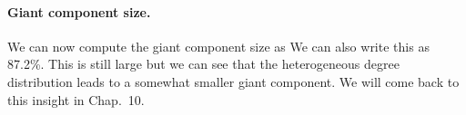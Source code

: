 \paragraph{Giant component size.}We can now compute the giant component size as 
We can also write this as 87.2\%. This is still large but we can see that the heterogeneous degree distribution leads to a somewhat smaller giant component. We will come back to this insight in Chap.~10.
